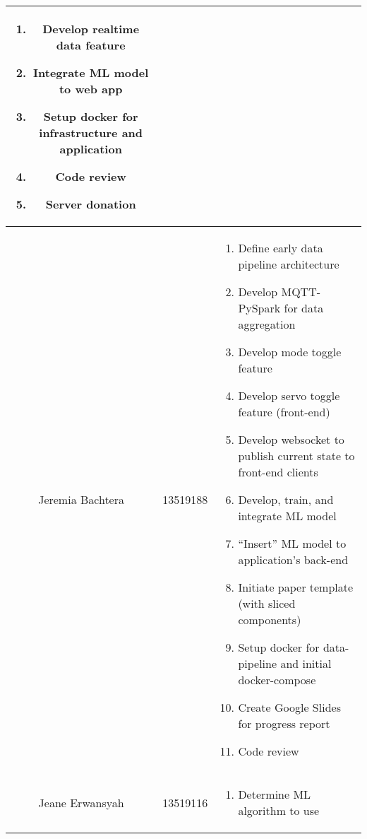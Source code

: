 \begin{table}[htbp]
\begin{center}
\begin{tabular}{|c|c|p{3cm}|}
\begin{enumerate}[leftmargin=*]
				                                         \item Develop realtime data feature
				                                         \item Integrate ML model to web app
				                                         \item Setup docker for infrastructure and application
				                                         \item Code review
				                                         \item Server donation
			                                         \end{enumerate}
			\\
			\hline
			Jeremia Bachtera & 13519188            & \begin{enumerate}[leftmargin=*]
				                                         \item Define early data pipeline architecture
				                                         \item Develop MQTT-PySpark for data aggregation
				                                         \item Develop mode toggle feature
				                                         \item Develop servo toggle feature (front-end)
				                                         \item Develop websocket to publish current state to front-end clients
				                                         \item Develop, train, and integrate ML model
				                                         \item ``Insert'' ML model to application's back-end
				                                         \item Initiate paper template (with sliced components)
				                                         \item Setup docker for data-pipeline and initial docker-compose
				                                         \item Create Google Slides for progress report
				                                         \item Code review
			                                         \end{enumerate}
			\\
			\hline
			Jeane Erwansyah  & 13519116            & \begin{enumerate}[leftmargin=*]
				                                         \item Determine ML algorithm to use

\end{enumerate}
\end{tabular}
\end{center}
\end{table}
